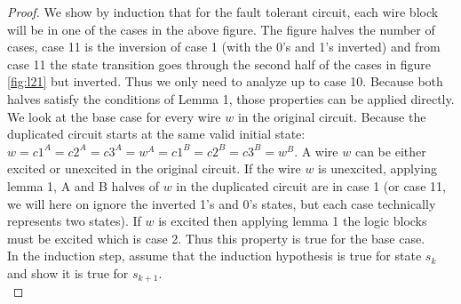 \documentclass[12pt]{report}
\begin{document}
\begin{proof}
We show by induction that for the fault tolerant circuit, each wire block will be in one of the cases in the above figure.  The figure halves the number of cases, case 11 is the inversion of case 1 (with the 0's and 1's inverted) and from case 11 the state transition goes through the second half of the cases in figure \ref{fig:l21} but inverted.  Thus we only need to analyze up to case 10.  Because both halves satisfy the conditions of Lemma 1, those properties can be applied directly.\\

We look at the base case for every wire $w$ in the original circuit.  Because the duplicated circuit starts at the same valid initial state: $w=c1^A=c2^A=c3^A=w^A=c1^B=c2^B=c3^B=w^B$.  A wire $w$ can be either excited or unexcited in the original circuit. If the wire $w$ is unexcited, applying lemma 1,  A and B halves of $w$ in the duplicated circuit are in case 1 (or case 11, we will here on ignore the inverted 1's and 0's states, but each case technically represents two states).  If $w$ is excited then applying lemma 1 the logic blocks must be excited which is case 2.  Thus this property is true for the base case. \\

In the induction step, assume that the induction hypothesis is true for state $s_k$ and show it is true for $s_{k+1}$.  \\


\end{proof}
\end{document}

